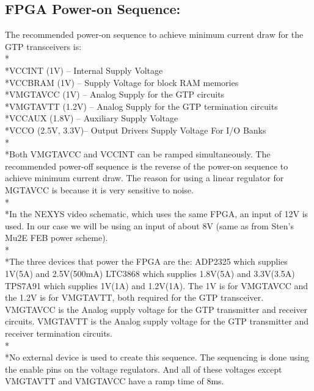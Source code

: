\subsection{FPGA Power-on Sequence: }

The recommended power-on sequence to achieve minimum current draw for the GTP transceivers is:
\\*
\\*VCCINT (1V) – Internal Supply Voltage
\\*VCCBRAM (1V) – Supply Voltage for block RAM memories
\\*VMGTAVCC (1V) – Analog Supply for the GTP circuits
\\*VMGTAVTT (1.2V) – Analog Supply for the GTP termination circuits
\\*VCCAUX (1.8V) – Auxiliary Supply Voltage
\\*VCCO (2.5V, 3.3V)– Output Drivers Supply Voltage For I/O Banks
\\*
\\*Both VMGTAVCC and VCCINT can be ramped simultaneously. The recommended
power-off sequence is the reverse of the power-on sequence to achieve minimum current draw. The reason for using a linear regulator for  MGTAVCC is because it is very sensitive to noise.
\\*
\\*In the NEXYS video schematic, which uses the same FPGA, an input of 12V is used. In our case we will be using an input of about 8V (same as from Sten’s Mu2E FEB power scheme). 
\\*
\\*The three devices that power the FPGA are the:
 ADP2325 which supplies 1V(5A) and 2.5V(500mA)
LTC3868 which supplies 1.8V(5A) and 3.3V(3.5A)
TPS7A91 which supplies 1V(1A) and 1.2V(1A). 
The 1V is for VMGTAVCC and the  1.2V is for VMGTAVTT, both required for the GTP transceiver. VMGTAVCC is the Analog supply voltage for the GTP transmitter and receiver circuits. VMGTAVTT is the Analog supply voltage for the GTP transmitter and receiver termination circuits. 
\\*
\\*No external device is used to create this sequence. 
The sequencing is done using the enable pins on the voltage regulators. And all of these voltages except VMGTAVTT and VMGTAVCC have a ramp time of 8ms.